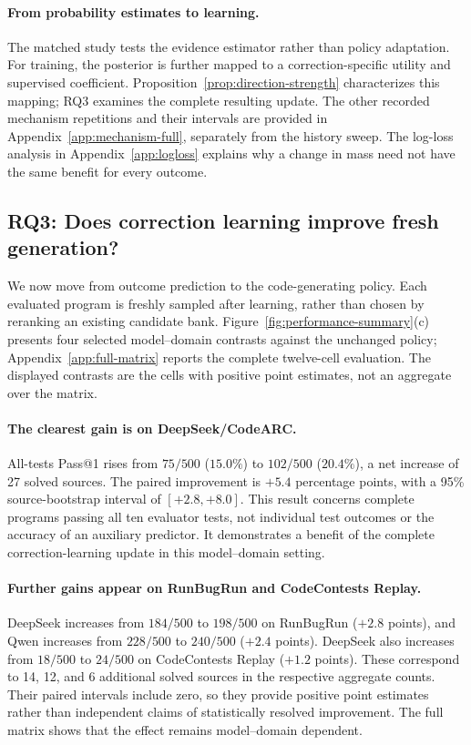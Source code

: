 \documentclass{article}
\begin{document}
\paragraph{From probability estimates to learning.}
The matched study tests the evidence estimator rather than policy adaptation. For training, the posterior is further mapped to a correction-specific utility and supervised coefficient. Proposition~\ref{prop:direction-strength} characterizes this mapping; RQ3 examines the complete resulting update. The other recorded mechanism repetitions and their intervals are provided in Appendix~\ref{app:mechanism-full}, separately from the history sweep. The log-loss analysis in Appendix~\ref{app:logloss} explains why a change in mass need not have the same benefit for every outcome.

\subsection{RQ3: Does correction learning improve fresh generation?}
\label{sec:rq3}

We now move from outcome prediction to the code-generating policy. Each evaluated program is freshly sampled after learning, rather than chosen by reranking an existing candidate bank. Figure~\ref{fig:performance-summary}(c) presents four selected model--domain contrasts against the unchanged policy; Appendix~\ref{app:full-matrix} reports the complete twelve-cell evaluation. The displayed contrasts are the cells with positive point estimates, not an aggregate over the matrix.

\paragraph{The clearest gain is on DeepSeek/CodeARC.}
All-tests Pass@1 rises from $75/500$ ($15.0\%$) to $102/500$ ($20.4\%$), a net increase of 27 solved sources. The paired improvement is $+5.4$ percentage points, with a 95\% source-bootstrap interval of $[+2.8,+8.0]$. This result concerns complete programs passing all ten evaluator tests, not individual test outcomes or the accuracy of an auxiliary predictor. It demonstrates a benefit of the complete correction-learning update in this model--domain setting.

\paragraph{Further gains appear on RunBugRun and CodeContests Replay.}
DeepSeek increases from $184/500$ to $198/500$ on RunBugRun ($+2.8$ points), and Qwen increases from $228/500$ to $240/500$ ($+2.4$ points). DeepSeek also increases from $18/500$ to $24/500$ on CodeContests Replay ($+1.2$ points). These correspond to 14, 12, and 6 additional solved sources in the respective aggregate counts. Their paired intervals include zero, so they provide positive point estimates rather than independent claims of statistically resolved improvement. The full matrix shows that the effect remains model--domain dependent.
\end{document}
